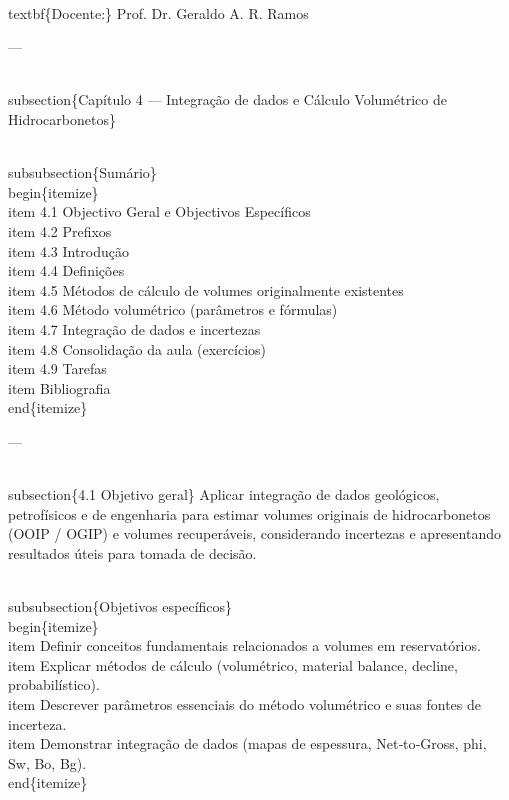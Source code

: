 \documentclass[11pt,a4paper]{article}
\begin{document}
\begin{enumerate}
{ \\textbf\{Docente:\} Prof. Dr. Geraldo A. R. Ramos

 ---

\\subsection\{Capítulo 4 — Integração de dados e Cálculo Volumétrico de Hidrocarbonetos\}

\\subsubsection\{Sumário\}
\\begin\{itemize\}
\\item 4.1 Objectivo Geral e Objectivos Específicos
\\item 4.2 Prefixos
\\item 4.3 Introdução
\\item 4.4 Definições
\\item 4.5 Métodos de cálculo de volumes originalmente existentes
\\item 4.6 Método volumétrico (parâmetros e fórmulas)
\\item 4.7 Integração de dados e incertezas
\\item 4.8 Consolidação da aula (exercícios)
\\item 4.9 Tarefas
\\item Bibliografia
\\end\{itemize\}

 ---

\\subsection\{4.1 Objetivo geral\}
Aplicar integração de dados geológicos, petrofísicos e de engenharia para estimar volumes originais de hidrocarbonetos (OOIP / OGIP) e volumes recuperáveis, considerando incertezas e apresentando resultados úteis para tomada de decisão.

\\subsubsection\{Objetivos específicos\}
\\begin\{itemize\}
\\item Definir conceitos fundamentais relacionados a volumes em reservatórios.
\\item Explicar métodos de cálculo (volumétrico, material balance, decline, probabilístico).
\\item Descrever parâmetros essenciais do método volumétrico e suas fontes de incerteza.
\\item Demonstrar integração de dados (mapas de espessura, Net‑to‑Gross, phi, Sw, Bo, Bg).
\\end\{itemize\}

}
\end{enumerate}
\end{document}
